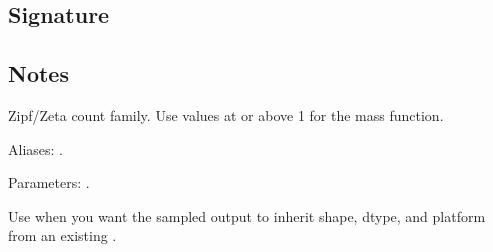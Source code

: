 \documentclass[letterpaper,10pt,english]{sphinxmanual}
\begin{document}
\subsection{Signature}
\label{\detokenize{distribution_catalog:id148}}
\begin{sphinxVerbatim}[commandchars=\\\{\}]
\end{sphinxVerbatim}


\subsection{Notes}
\label{\detokenize{distribution_catalog:id149}}
\sphinxAtStartPar
Zipf/Zeta count family. Use values at or above 1 for the mass function.

\sphinxAtStartPar
Aliases: .

\sphinxAtStartPar
Parameters: .

\sphinxAtStartPar
Use  when you want the sampled output to inherit shape, dtype, and platform from an existing .
\end{document}
